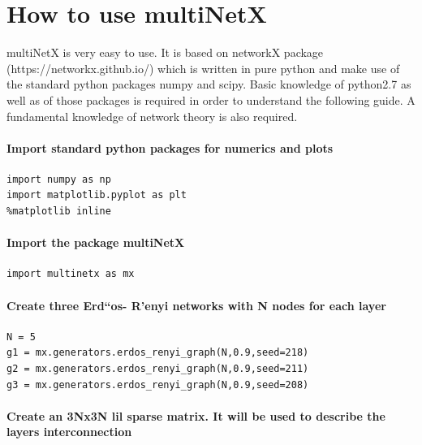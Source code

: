 \documentclass[11pt]{article}
\begin{document}
\section{How to use multiNetX}\label{how-to-use-multinetx}

multiNetX is very easy to use. It is based on networkX package
(https://networkx.github.io/) which is written in pure python and make
use of the standard python packages numpy and scipy. Basic knowledge of
python2.7 as well as of those packages is required in order to
understand the following guide. A fundamental knowledge of network
theory is also required.

\paragraph{Import standard python packages for numerics and
plots}\label{import-standard-python-packages-for-numerics-and-plots}

\begin{verbatim}
import numpy as np
import matplotlib.pyplot as plt
%matplotlib inline
\end{verbatim}

\paragraph{Import the package
multiNetX}\label{import-the-package-multinetx}

\begin{verbatim}
import multinetx as mx
\end{verbatim}


\paragraph{Create three Erd``os- R'enyi networks with N nodes for each
layer}\label{create-three-erdos--renyi-networks-with-n-nodes-for-each-layer}

\begin{verbatim}
N = 5
g1 = mx.generators.erdos_renyi_graph(N,0.9,seed=218)
g2 = mx.generators.erdos_renyi_graph(N,0.9,seed=211)
g3 = mx.generators.erdos_renyi_graph(N,0.9,seed=208)
\end{verbatim}

\paragraph{Create an 3Nx3N lil sparse matrix. It will be used to
describe the layers
interconnection}\label{create-an-3nx3n-lil-sparse-matrix.-it-will-be-used-to-describe-the-layers-interconnection}
\end{document}
